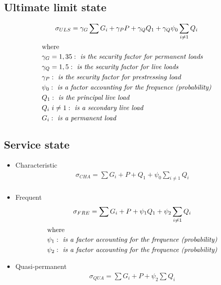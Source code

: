 \documentclass[landscape]{article}
\begin{document}
\begin{multicols*}{2}
\subsection{Ultimate limit state} %
\label{sub:ultimate_limit_state}
\begin{gather}\label{eq:2.1}
      \sigma_{ULS} = \gamma_G \sum G_i + \gamma_P P + \gamma_Q Q_1+ \gamma_Q \psi_0\sum_{i\neq 1} Q_i  \\
      \shortintertext{where}
      \begin{aligned}
        &\gamma_G = 1,35: \emph{ is the security factor for permanent loads} \\
        &\gamma_Q = 1,5: \emph{ is the security factor for live loads} \\
        &\gamma_P: \emph{ is the security factor for prestressing load} \\
        &\psi_0 : \emph{ is a factor accounting for the frequence (probability)}\\
        &Q_1: \emph{ is the principal live load}\\
        &Q_i \ i \neq 1: \emph{ is a secondary live load} \\
        &G_i: \emph{ is a permanent load}
      \end{aligned}\notag
    \end{gather}
\subsection{Service state} %
\label{sub:service_state}
\begin{itemize}[label=]
  \item Characteristic
  \begin{gather}\label{eq:2.1}
      \sigma_{CHA} = \sum G_i + P + Q_1+ \psi_0\sum_{i\neq 1} Q_i  \\
  \end{gather}
  \item Frequent
    \begin{gather}\label{eq:2.1}
      \sigma_{FRE} = \sum G_i + P + \psi_1Q_1+ \psi_2\sum_{i\neq 1} Q_i  \\
      \shortintertext{where}
      \begin{aligned}
        &\psi_1 : \emph{ is a factor accounting for the frequence (probability)}\\
        &\psi_2 : \emph{ is a factor accounting for the frequence (probability)}
      \end{aligned}\notag
  \end{gather}
  \item Quasi-permanent
  \begin{gather}\label{eq:2.1}
      \sigma_{QUA} = \sum G_i + P + \psi_2\sum Q_i  \\
  \end{gather}
\end{itemize}


\end{multicols*}
\end{document}
